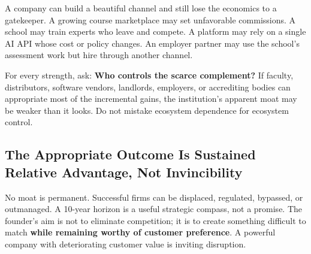 A company can build a beautiful channel and still lose the economics to a gatekeeper. A growing course marketplace may set unfavorable commissions. A school may train experts who leave and compete. A platform may rely on a single AI API whose cost or policy changes. An employer partner may use the school's assessment work but hire through another channel.

For every strength, ask: \textbf{Who controls the scarce complement?} If faculty, distributors, software vendors, landlords, employers, or accrediting bodies can appropriate most of the incremental gains, the institution's apparent moat may be weaker than it looks. Do not mistake ecosystem dependence for ecosystem control.

\subsection{The Appropriate Outcome Is Sustained Relative Advantage, Not Invincibility}
\label{sec:appropriate_outcome_sustained_relative_advantage}

No moat is permanent. Successful firms can be displaced, regulated, bypassed, or outmanaged. A 10-year horizon is a useful strategic compass, not a promise. The founder's aim is not to eliminate competition; it is to create something difficult to match \textbf{while remaining worthy of customer preference}. A powerful company with deteriorating customer value is inviting disruption.

